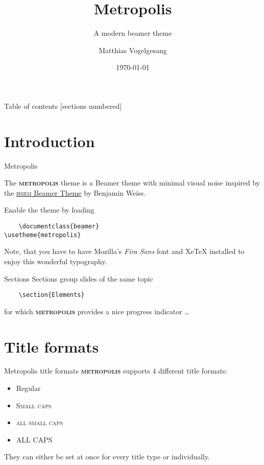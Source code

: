 \documentclass[10pt]{beamer}
\title{Metropolis}
\subtitle{A modern beamer theme}
\date{\today}
\author{Matthias Vogelgesang}
\institute{Center for modern beamer themes}
\newcommand{\themename}{\textbf{\textsc{metropolis}}\xspace}
\begin{document}
    
    \maketitle
    
    \begin{frame}{Table of contents}
    [sections numbered]
    \tableofcontents[hideallsubsections]
\end{frame}

\section{Introduction}

\begin{frame}[fragile]{Metropolis}

The \themename theme is a Beamer theme with minimal visual noise
inspired by the \href{https://github.com/hsrmbeamertheme/hsrmbeamertheme}{\textsc{hsrm} Beamer
    Theme} by Benjamin Weiss.

Enable the theme by loading

\begin{verbatim}    \documentclass{beamer}
\usetheme{metropolis}\end{verbatim}

Note, that you have to have Mozilla's \emph{Fira Sans} font and XeTeX
installed to enjoy this wonderful typography.
\end{frame}
\begin{frame}[fragile]{Sections}
Sections group slides of the same topic

\begin{verbatim}    \section{Elements}\end{verbatim}

for which \themename provides a nice progress indicator \ldots
\end{frame}

\section{Title formats}

\begin{frame}{Metropolis title formats}
\themename supports 4 different title formats:
\begin{itemize}
\item Regular
\item \textsc{Small caps}
\item \textsc{all small caps}
\item ALL CAPS
\end{itemize}
They can either be set at once for every title type or individually.
\end{frame}
\end{document}
